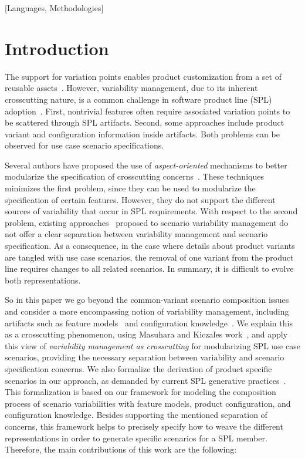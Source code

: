 \documentclass{acm_proc_article-sp}
\begin{document}
[Languages,
Methodologies]\




\section{Introduction}
The support for variation points enables product customization from a set of
reusable assets~\cite{Pohl:2005aa}. However, variability management, due to its
inherent crosscutting nature, is a common challenge in software product line
(SPL) adoption~\cite{Clements:2001aa,Pohl:2005aa}. First, nontrivial features
often require associated variation points to be scattered through SPL artifacts.
Second, some approaches include product variant and configuration information
inside artifacts. Both problems can be observed for use case scenario
specifications.

Several authors have proposed the use of \emph{aspect-oriented} mechanisms to
better modularize the specification of crosscutting
concerns~\cite{Moreira:2004aa,Chitchyan:2007aa}. These techniques minimizes the
first problem, since they can be used to modularize the specification of certain
features. However, they do not support the different sources of variability that
occur in SPL requirements. With respect to the second problem, existing
approaches~\cite{Bertolino:2003aa,Eriksson:2005aa} proposed to
scenario variability management do not offer a clear separation between
variability management and scenario specification. As a consequence, in the case
where details about product variants are tangled with use case scenarios, the
removal of one variant from the product line requires changes to all related
scenarios. In summary, it is difficult to evolve both representations.

So in this paper we go beyond the common-variant scenario composition issues and
consider a more encompassing notion of variability management, including
artifacts such as feature models~\cite{Gheyi:2006aa,Czarnecki:2000aa} and
configuration knowledge~\cite{Czarnecki:2000aa,Pohl:2005aa}. We explain this as a
crosscutting phenomenon, using Masuhara and Kiczales work~\cite{Masuhara:2003aa},
and apply this view of \emph{variability management as crosscutting} for
modularizing SPL use case scenarios, providing the necessary separation between
variability and scenario specification concerns. We also formalize the derivation
of product specific scenarios in our approach, as demanded by current SPL
generative practices~\cite{Krueger:2006aa}. This formalization is based on our
framework for modeling the composition process of scenario variabilities with
feature models, product configuration, and configuration knowledge. Besides
supporting the mentioned separation of concerns, this framework helps to
precisely specify how to weave the different representations in order to generate
specific scenarios for a SPL member. Therefore, the main contributions of this
work are the following:
\end{document}
